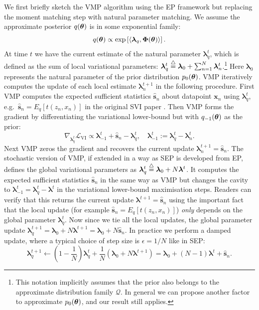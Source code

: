 We first briefly sketch the VMP algorithm using the EP framework but replacing the moment matching step with natural parameter matching. We assume the approximate posterior $q(\bm{\theta})$ is in some exponential family: 
\begin{equation}
q(\bm{\theta}) \propto \exp \left[ \langle \bm{\lambda}_q, \bm{\Phi}(\bm{\theta}) \rangle \right].
\end{equation}
At time $t$ we have the current estimate of the natural parameter $\bm{\lambda}_q^t$, which is defined as the sum of local variational parameters:
%
$\bm{\lambda}_q^t \buildrel\triangle\over = \bm{\lambda}_0 + \sum_{n=1}^N \bm{\lambda}_n^t$.\footnote{This notation implicitly assumes that the prior also belongs to the approximate distribution family $\mathcal{Q}$. In general we can propose another factor to approximate $p_0(\bm{\theta})$, and our result still applies.}
%
Here $\bm{\lambda}_0$ represents the natural parameter of the prior distribution $p_0(\bm{\theta})$. VMP iteratively computes the update of each local estimate $\bm{\lambda}_n^{t+1}$ in the following procedure. First VMP computes the expected sufficient statistics $\hat{\bm{s}}_n$ about datapoint $\bm{x}_n$ using $\bm{\lambda}_q^t$, e.g.~$\hat{\bm{s}}_n = E_{q}[t(z_n, x_n)]$ in the original SVI paper \citep{hoffman:svi2013}. Then VMP forms the gradient by differentiating the variational lower-bound but with $q_{-1}(\bm{\theta})$ as the prior:
\begin{equation}
\nabla_{\bm{\lambda}_q^t} \mathcal{L}_{\text{VI}} \propto \bm{\lambda}_{-1}^t + \hat{\bm{s}}_n - \bm{\lambda}_q^t, \quad
\bm{\lambda}_{-1}^t := \bm{\lambda}_q^t - \bm{\lambda}_{n}^t.
\end{equation}
Next VMP zeros the gradient and recovers the current update $\bm{\lambda}_n^{t+1} = \hat{\bm{s}}_n$. The stochastic version of VMP, if extended in a way as SEP is developed from EP, defines the global variational parameters as $\bm{\lambda}_q^t \buildrel\triangle\over = \bm{\lambda}_0 + N \bm{\lambda}^t$. It computes the expected sufficient statistics $\hat{\bm{s}}_n$ in the same way as VMP but changes the cavity to $\bm{\lambda}_{-1}^t = \bm{\lambda}_q^t - \bm{\lambda}^t$ in the variational lower-bound maximisation steps. Readers can verify that this returns the current update $\bm{\lambda}^{t+1} = \hat{\bm{s}}_n$ using the important fact that the local update (for example $\hat{\bm{s}}_n = E_{q}[t(z_n, x_n)]$) \emph{only} depends on the global parameter $\bm{\lambda}_q^t$. Now since we tie all the local updates, the global parameter update $\bm{\lambda}_q^{t+1} = \bm{\lambda}_0 + N \bm{\lambda}^{t+1} = \bm{\lambda}_0 + N \hat{\bm{s}}_n$. In practice we perform a damped update, where a typical choice of step size is $\epsilon = 1/N$ like in SEP:
\begin{equation}
\bm{\lambda}_q^{t+1} \leftarrow (1 - \frac{1}{N}) \bm{\lambda}_q^t + \frac{1}{N}(\bm{\lambda}_0 + N \bm{\lambda}^{t+1}) = \bm{\lambda}_0 + (N-1) \bm{\lambda}^t + \hat{\bm{s}}_n.
\end{equation} 

